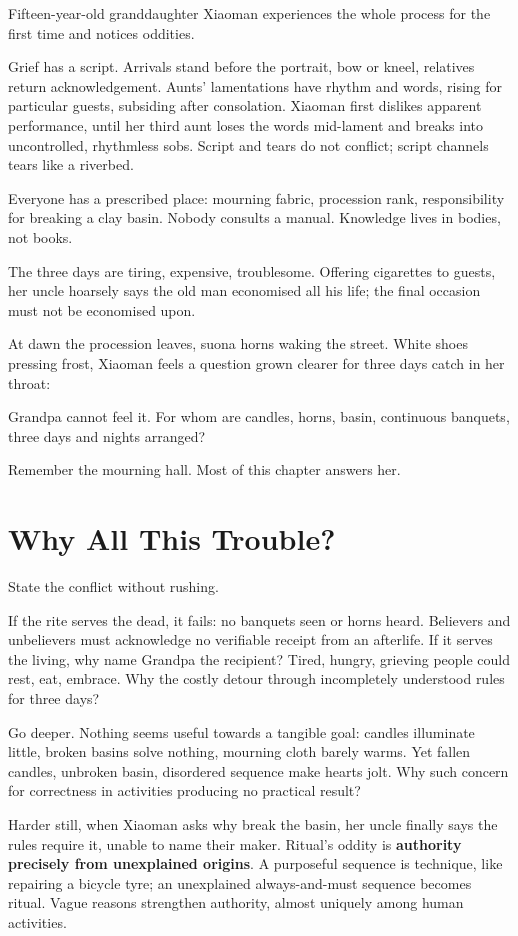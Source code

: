 Fifteen-year-old granddaughter Xiaoman experiences the whole process for the first time and notices oddities.

Grief has a script. Arrivals stand before the portrait, bow or kneel, relatives return acknowledgement. Aunts' lamentations have rhythm and words, rising for particular guests, subsiding after consolation. Xiaoman first dislikes apparent performance, until her third aunt loses the words mid-lament and breaks into uncontrolled, rhythmless sobs. Script and tears do not conflict; script channels tears like a riverbed.

Everyone has a prescribed place: mourning fabric, procession rank, responsibility for breaking a clay basin. Nobody consults a manual. Knowledge lives in bodies, not books.

The three days are tiring, expensive, troublesome. Offering cigarettes to guests, her uncle hoarsely says the old man economised all his life; the final occasion must not be economised upon.

At dawn the procession leaves, suona horns waking the street. White shoes pressing frost, Xiaoman feels a question grown clearer for three days catch in her throat:

Grandpa cannot feel it. For whom are candles, horns, basin, continuous banquets, three days and nights arranged?

Remember the mourning hall. Most of this chapter answers her.

\section{Why All This Trouble?}
State the conflict without rushing.

If the rite serves the dead, it fails: no banquets seen or horns heard. Believers and unbelievers must acknowledge no verifiable receipt from an afterlife. If it serves the living, why name Grandpa the recipient? Tired, hungry, grieving people could rest, eat, embrace. Why the costly detour through incompletely understood rules for three days?

Go deeper. Nothing seems useful towards a tangible goal: candles illuminate little, broken basins solve nothing, mourning cloth barely warms. Yet fallen candles, unbroken basin, disordered sequence make hearts jolt. Why such concern for correctness in activities producing no practical result?

Harder still, when Xiaoman asks why break the basin, her uncle finally says the rules require it, unable to name their maker. Ritual's oddity is \textbf{authority precisely from unexplained origins}. A purposeful sequence is technique, like repairing a bicycle tyre; an unexplained always-and-must sequence becomes ritual. Vague reasons strengthen authority, almost uniquely among human activities.

